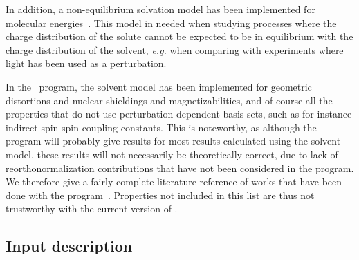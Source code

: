 In addition, a non-equilibrium
solvation model has been implemented
for molecular energies~\cite{kvmachahjajjcp103}. This model in needed
when studying processes where the charge distribution of the solute
cannot be expected to be in equilibrium with the charge distribution
of the solvent, {\it e.g.\/} when comparing with experiments where light has
been used as a perturbation.

In the \aba\ program, the solvent model has been implemented for
geometric distortions and nuclear shieldings and
magnetizabilities,
and of course all the
properties that do not use perturbation-dependent basis
sets, such as for
instance indirect spin-spin coupling 
constants. This is noteworthy, as
although the program will probably give results for most results
calculated using the solvent  model, these results will not
necessarily be theoretically correct, due to lack of reorthonormalization
contributions that have not been considered in the program. We
therefore give a fairly complete literature reference of works that
have been done with the
program~\cite{kvmpjkrthjcp106,poakvmkrthjpc100}. Properties not
included in this list are thus not trustworthy with the current
version of {\dalton}.

\subsection{Input description}\label{sec:solventinp}

